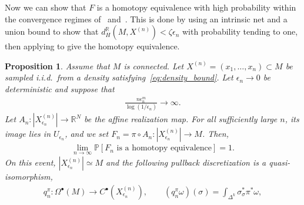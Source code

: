 \documentclass[11pt,reqno]{amsproc}
\numberwithin{equation}{section}
\newcommand{\R}{\mathbb{R}}
\newcommand{\PP}{\mathbb{P}}
\newtheorem{proposition}[counter]{Proposition}
\theoremstyle{definition}
\theoremstyle{plain}
\begin{document}
    Now we can show that $F$ is a homotopy equivalence with high probability within the convergence regimes of~ and~. This is done by using an intrinsic net and a union bound to show that $d_H^\R(M,X^{(n)})<\zeta\epsilon_n$ with probability tending to one, then applying  to give the homotopy equivalence.
    \begin{proposition} \label{prop:topology_quasi_iso_convergence_scales}
        Assume that $M$ is connected.  Let $X^{(n)}=(x_1,\ldots,x_n)\subset M$ be sampled i.i.d.~from a density satisfying~\eqref{eq:density_bound}.  Let $\epsilon_n\to0$ be deterministic and suppose that
        \begin{align} \label{eq:topology_bandwidth_condition_sec43}
            \frac{n\epsilon_n^m}{\log(1/\epsilon_n)}\to\infty.
        \end{align}
        Let $A_n:|X^{(n)}_{\epsilon_n}|\to \R^N$ be the affine realization map. For all sufficiently large $n$, its image lies in $U_{\epsilon_n}$, and we set $F_n=\pi\circ A_n:|X^{(n)}_{\epsilon_n}|\to M$.  Then, %
        \begin{align}
            \lim_{n \to \infty} \PP\left[F_n \text{ is a homotopy equivalence}\right]
            =1.
        \end{align}
        On this event, $|X^{(n)}_{\epsilon_n}|\simeq M$ and the following pullback discretization is a quasi-isomorphism,
        \begin{align}
            q_n^\pi:\Omega^\bullet(M)\to C^\bullet(X^{(n)}_{\epsilon_n}),
            \qquad
            (q_n^\pi\omega)(\sigma)=\int_{\Delta^k}\sigma_\sigma^*\pi^*\omega,
        \end{align}
    \end{proposition}
\end{document}
